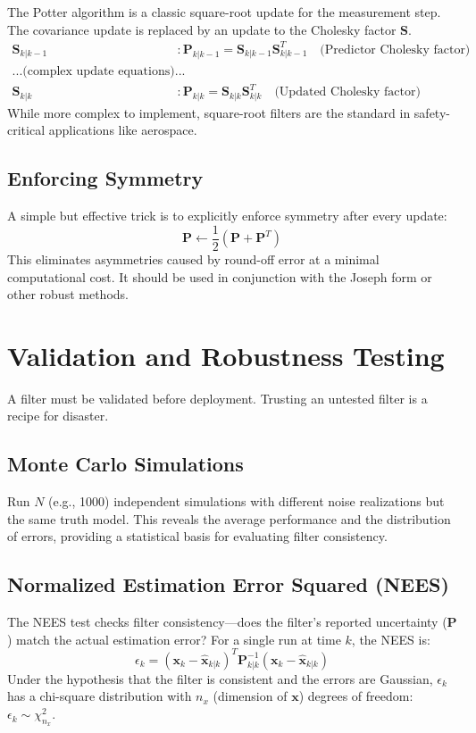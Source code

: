 \documentclass[11pt]{article}
\begin{document}
The Potter algorithm is a classic square-root update for the measurement step. The covariance update is replaced by an update to the Cholesky factor $\bm{S}$.
\begin{align}
\bm{S}_{k|k-1} &: \bm{P}_{k|k-1} = \bm{S}_{k|k-1} \bm{S}_{k|k-1}^T \quad \text{(Predictor Cholesky factor)} \\
... \text{(complex update equations)} ... \\
\bm{S}_{k|k} &: \bm{P}_{k|k} = \bm{S}_{k|k} \bm{S}_{k|k}^T \quad \text{(Updated Cholesky factor)}
\end{align}
While more complex to implement, square-root filters are the standard in safety-critical applications like aerospace.

\subsection{Enforcing Symmetry}
A simple but effective trick is to explicitly enforce symmetry after every update:
\begin{equation}
\bm{P} \gets \frac{1}{2} (\bm{P} + \bm{P}^T)
\end{equation}
This eliminates asymmetries caused by round-off error at a minimal computational cost. It should be used in conjunction with the Joseph form or other robust methods.

\section{Validation and Robustness Testing}
\label{sec:validation}
A filter must be validated before deployment. Trusting an untested filter is a recipe for disaster.

\subsection{Monte Carlo Simulations}
Run $N$ (e.g., 1000) independent simulations with different noise realizations but the same truth model. This reveals the average performance and the distribution of errors, providing a statistical basis for evaluating filter consistency.

\subsection{Normalized Estimation Error Squared (NEES)}
The NEES test checks filter consistency—does the filter's reported uncertainty ($\bm{P}$) match the actual estimation error?
For a single run at time $k$, the NEES is:
\begin{equation}
\epsilon_k = (\bm{x}_k - \hat{\bm{x}}_{k|k})^T \bm{P}_{k|k}^{-1} (\bm{x}_k - \hat{\bm{x}}_{k|k})
\end{equation}
Under the hypothesis that the filter is consistent and the errors are Gaussian, $\epsilon_k$ has a chi-square distribution with $n_x$ (dimension of $\bm{x}$) degrees of freedom: $\epsilon_k \sim \chi^2_{n_x}$.
\end{document}
